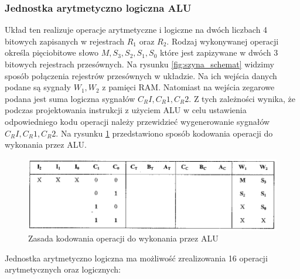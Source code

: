 \documentclass[../main.tex]{subfiles}
\begin{document}
        \subsubsection*{Jednostka arytmetyczno logiczna ALU}
        
        Układ ten realizuje operacje arytmetyczne i logiczne na dwóch liczbach 4 bitowych zapisanych w rejestrach $R_1$ oraz $R_2$.
        Rodzaj wykonywanej operacji określa pięciobitowe słowo $M, S_3, S_2, S_1, S_0$ które jest zapizywane w dwóch 3 bitowych rejestrach przesównych.
        Na rysunku \ref{fig:szyna_schemat} widzimy sposób połączenia rejestrów przesównych w układzie. Na ich wejścia danych podane są 
        sygnały $W_1, W_2$ z pamięci RAM. Natomiast na wejścia zegarowe podana jest suma logiczna sygnałów $C_RI, C_R1, C_R2$. Z tych zależności
        wynika, że podczas projektowania instrukcji z użyciem ALU w celu ustawienia odpowiedniego kodu operacji należy przewidzieć 
        wygenerowanie sygnałów $C_RI, C_R1, C_R2$. Na rysunku \ref{fig:kodowanie_alu} przedstawiono sposób kodowania operacji do wykonania przez ALU.

        \begin{figure}[H]
            \centering
            \includegraphics[width=\linewidth]{kodowanie_alu.png}
            \caption{Zasada kodowania operacji do wykonania przez ALU}
            \label{fig:kodowanie_alu}
        \end{figure}

        Jednostka arytmetyczno logiczna ma możliwość zrealizowania 16 operacji arytmetycznych oraz logicznych:
\end{document}
